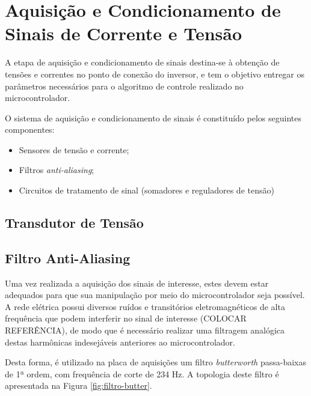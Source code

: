 \section{Aquisição e Condicionamento de Sinais de Corrente e Tensão}

A etapa de aquisição e condicionamento de sinais destina-se à obtenção de tensões e correntes no ponto de conexão do inversor, e tem o objetivo entregar os parâmetros necessários para o algoritmo de controle realizado no microcontrolador. 

O sistema de aquisição e condicionamento de sinais é constituído pelos seguintes componentes:

\begin{itemize}
	\item Sensores de tensão e corrente;
	\item Filtros \textit{anti-aliasing};
	\item Circuitos de tratamento de sinal (somadores e reguladores de tensão)
\end{itemize}

\subsection{Transdutor de Tensão}

\subsection{Filtro Anti-Aliasing}

	Uma vez realizada a aquisição dos sinais de interesse, estes devem estar adequados para que sua manipulação por meio do microcontrolador seja possível. A rede elétrica possui diversos ruídos e transitórios eletromagnéticos de alta frequência que podem interferir no sinal de interesse (COLOCAR REFERÊNCIA), de modo que é necessário realizar uma filtragem analógica destas harmônicas indesejáveis anteriores ao microcontrolador.
	
	Desta forma, é utilizado na placa de aquisições um filtro \textit{butterworth} passa-baixas de 1ª ordem, com frequência de corte de 234 Hz. A topologia deste filtro é apresentada na Figura \ref{fig:filtro-butter}.
	
